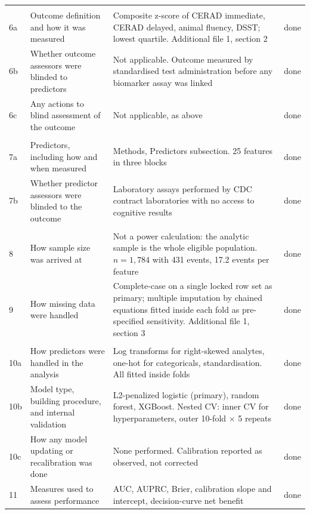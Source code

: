\documentclass[10pt]{article}
\begin{document}
\begin{longtable}{C{0.7cm}L{4.3cm}L{9cm}C{1.2cm}}
\addlinespace
{} \\
6a & Outcome definition and how it was measured & Composite z-score of CERAD immediate, CERAD delayed, animal fluency, DSST; lowest quartile. Additional file 1, section 2 & done \\
6b & Whether outcome assessors were blinded to predictors & Not applicable. Outcome measured by standardised test administration before any biomarker assay was linked & done \\
6c & Any actions to blind assessment of the outcome & Not applicable, as above & done \\
\addlinespace
{} \\
7a & Predictors, including how and when measured & Methods, Predictors subsection. 25 features in three blocks & done \\
7b & Whether predictor assessors were blinded to the outcome & Laboratory assays performed by CDC contract laboratories with no access to cognitive results & done \\
\addlinespace
{} \\
8 & How sample size was arrived at & Not a power calculation: the analytic sample is the whole eligible population. $n=1{,}784$ with 431 events, 17.2 events per feature & done \\
9 & How missing data were handled & Complete-case on a single locked row set as primary; multiple imputation by chained equations fitted inside each fold as pre-specified sensitivity. Additional file 1, section 3 & done \\
\addlinespace
{} \\
10a & How predictors were handled in the analysis & Log transforms for right-skewed analytes, one-hot for categoricals, standardisation. All fitted inside folds & done \\
10b & Model type, building procedure, and internal validation & L2-penalized logistic (primary), random forest, XGBoost. Nested CV: inner CV for hyperparameters, outer 10-fold $\times$ 5 repeats & done \\
10c & How any model updating or recalibration was done & None performed. Calibration reported as observed, not corrected & done \\
11 & Measures used to assess performance & AUC, AUPRC, Brier, calibration slope and intercept, decision-curve net benefit & done \\

\end{longtable}
\end{document}

